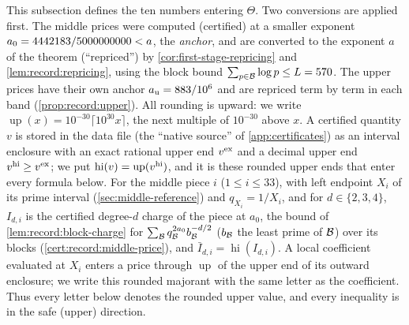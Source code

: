 This subsection defines the ten numbers entering $\Theta$. Two
conversions are applied first. The middle prices were computed
(certified) at a smaller exponent $a_0=4442183/5000000000<a$, the
\emph{anchor}, and are converted to the exponent $a$ of the
theorem (``repriced'') by \cref{cor:first-stage-repricing} and
\cref{lem:record:repricing}, using the block bound
$\sum_{p\in\mathcal B}\log p\le L=570$. The upper prices have their own
anchor $a_{\rm u}=883/10^6$ and are repriced term by term in each
band (\cref{prop:record:upper}). All rounding is upward: we write
$\operatorname{up}(x)=10^{-30}\lceil10^{30}x\rceil$, the next
multiple of $10^{-30}$ above $x$. A certified quantity $v$ is
stored in the data file (the ``native source'' of
\cref{app:certificates}) as an interval enclosure with an exact
rational upper end $v^{\rm ex}$ and a decimal upper end
$v^{\rm hi}\ge v^{\rm ex}$; we put
$\operatorname{hi}(v)=\operatorname{up}(v^{\rm hi})$, and it is
these rounded upper ends that enter every formula below. For the middle piece $i$
($1\le i\le33$), with left endpoint $X_i$ of its prime interval (\cref{sec:middle-reference}) and $q_{X_i}=1/X_i$, and for $d\in\{2,3,4\}$,
$I_{d,i}$ is the certified degree-$d$ charge of the piece at $a_0$, the bound
of \cref{lem:record:block-charge} for
$\sum_{\mathcal B}q_{\mathcal B}^{2a_0}b_{\mathcal B}^{-d/2}$ ($b_\mathcal B$ the least
prime of $\mathcal B$) over its blocks
(\cref{cert:record:middle-price}), and $\bar I_{d,i}=\operatorname{hi}(I_{d,i})$.
A local coefficient evaluated at $X_i$ enters a price through
$\operatorname{up}$ of the upper end of its outward enclosure;
we write this rounded majorant with the same letter as the
coefficient. Thus every letter below denotes the rounded upper
value, and every inequality is in the safe (upper) direction.

